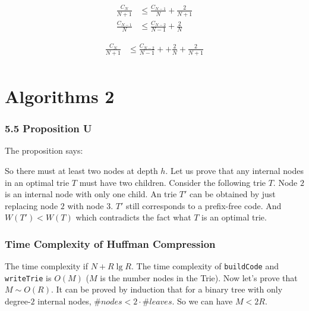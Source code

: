 \documentclass{book}
\begin{document}
\begin{align*}
\frac{C_N}{N+1} &\le \frac{C_{N-1}}{N} + \frac{2}{N+1} \\
\frac{C_{N-1}}{N} &\le \frac{C_{N-2}}{N-1} + \frac{2}{N}
\end{align*}

\begin{align*}
\frac{C_N}{N+1} &\le \frac{C_{N-2}}{N-1} + + \frac{2}{N} + \frac{2}{N+1} \\
\end{align*}

\part{Algorithms 2}
\section*{5.5 Proposition U}

The proposition says:


So there must at least two nodes at depth $h$. Let us prove that any internal
nodes in an optimal trie $T$ must have two children. Consider the following
trie $T$. Node $2$ is an internal node with only one child. An trie $T'$ can be obtained
by just replacing node $2$ with node $3$. $T'$ still corresponds to a prefix-free
code. And $W(T') < W(T)$ which contradicts the fact what $T$ is an optimal trie.


\section*{Time Complexity of Huffman Compression}

The time complexity if $N + R \lg R$. The time complexity of \verb+buildCode+
and \verb+writeTrie+ is $O(M)$ ($M$ is the number nodes in the Trie). Now let's
prove that $M \sim O(R)$.  It can be proved by induction that for a binary tree
with only degree-$2$ internal nodes, $\#nodes < 2 \cdot \#leaves$. So we can have $M <
2R$.
\end{document}
